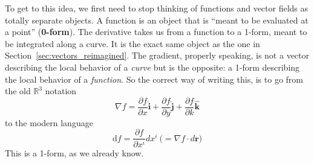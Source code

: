 \documentclass[../master.tex]{subfiles}
\begin{document}
	To get to this idea, we first need to stop thinking of functions and vector fields as totally separate objects. A function is an object that is ``meant to be evaluated at a point'' (\textbf{0-form}). The derivative takes us from a function to a 1-form, meant to be integrated along a curve. It is the exact same object as the one in Section~\ref{sec:vectors_reimagined}. The gradient, properly speaking, is not a vector describing the local behavior of a \emph{curve} but is the opposite: a 1-form describing the local behavior of a \emph{function}.
	So the correct way of writing this, is to go from the old $\mathbb{R}^3$ notation
	\begin{equation*}
		\nabla f = \frac{\partial f}{\partial x} \hat{\mathbf i}
					+\frac{\partial f}{\partial y} \hat{\mathbf j}
					+\frac{\partial f}{\partial k} \hat{\mathbf k}
	\end{equation*}
	to the modern language
	\begin{equation}
		\mathrm d f  = \frac{\partial f}{\partial x^i} dx^i ~\Big(= \nabla f \cdot d \mathbf r\Big)
	\end{equation}
	This is a 1-form, as we already know.
	
\end{document}
